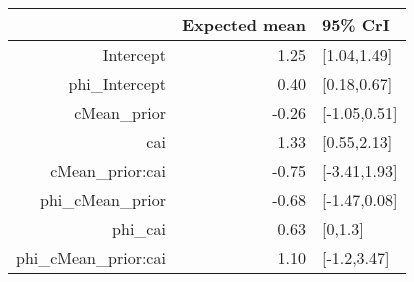 \begin{tabular}{rrl}
  \hline
 & Expected mean & 95\% CrI \\ 
  \hline
Intercept & 1.25 & [1.04,1.49] \\ 
  phi\_Intercept & 0.40 & [0.18,0.67] \\ 
  cMean\_prior & -0.26 & [-1.05,0.51] \\ 
  cai & 1.33 & [0.55,2.13] \\ 
  cMean\_prior:cai & -0.75 & [-3.41,1.93] \\ 
  phi\_cMean\_prior & -0.68 & [-1.47,0.08] \\ 
  phi\_cai & 0.63 & [0,1.3] \\ 
  phi\_cMean\_prior:cai & 1.10 & [-1.2,3.47] \\ 
   \hline
\end{tabular}

